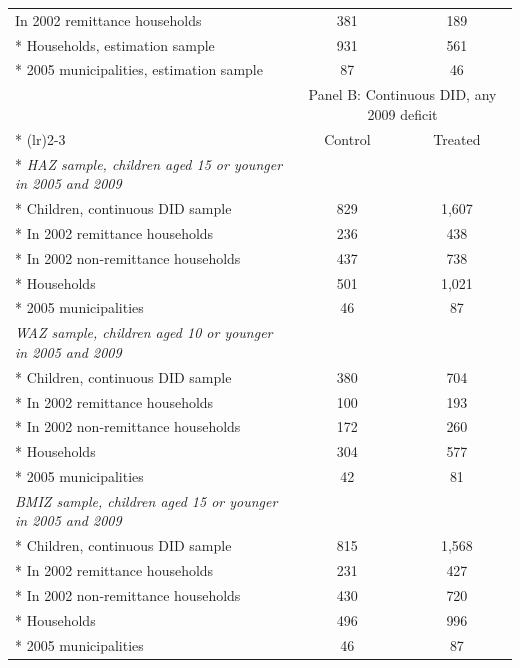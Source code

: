 \documentclass[12pt]{article}
\begin{document}
\begin{table}[H]
{\begin{tabular}{@{\extracolsep{\fill}}lcc}
\quad In 2002 remittance households & 381 & 189\\*
Households, estimation sample & 931 & 561\\*
2005 municipalities, estimation sample & 87 & 46\\
\bottomrule
\toprule
 & \multicolumn{2}{c}{Panel B: Continuous DID, any 2009 deficit}\\*
\cmidrule(lr){2-3}
 & Control & Treated\\*
\midrule
\textit{HAZ sample, children aged 15 or younger in 2005 and 2009} & & \\*
Children, continuous DID sample & 829 & 1,607\\*
\quad In 2002 remittance households & 236 & 438\\*
\quad In 2002 non-remittance households & 437 & 738\\*
Households & 501 & 1,021\\*
2005 municipalities & 46 & 87\\
\addlinespace[6pt]\textit{WAZ sample, children aged 10 or younger in 2005 and 2009} & & \\*
Children, continuous DID sample & 380 & 704\\*
\quad In 2002 remittance households & 100 & 193\\*
\quad In 2002 non-remittance households & 172 & 260\\*
Households & 304 & 577\\*
2005 municipalities & 42 & 81\\
\addlinespace[6pt]\textit{BMIZ sample, children aged 15 or younger in 2005 and 2009} & & \\*
Children, continuous DID sample & 815 & 1,568\\*
\quad In 2002 remittance households & 231 & 427\\*
\quad In 2002 non-remittance households & 430 & 720\\*
Households & 496 & 996\\*
2005 municipalities & 46 & 87\\
\bottomrule
\end{tabular}}%
\makebox[\textwidth][c]{\usebox{\tblbox}}%
\end{table}
\clearpage
\noindent
\end{document}
